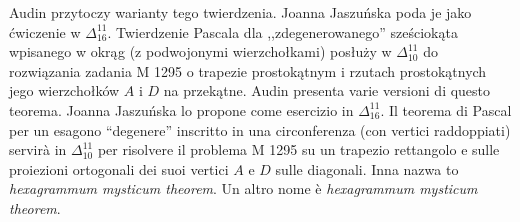 Audin \cite[s. 103, 107, 209]{audin_2003} przytoczy warianty tego twierdzenia. %
Joanna Jaszuńska poda je jako ćwiczenie w $\Delta_{16}^{11}$. %
Twierdzenie Pascala dla ,,zdegenerowanego'' sześciokąta wpisanego w okrąg (z podwojonymi wierzchołkami) posłuży w $\Delta_{10}^{11}$ do rozwiązania zadania M 1295 o trapezie prostokątnym i rzutach prostokątnych jego wierzchołków $A$ i $D$ na przekątne. %
Audin \cite[pp. 103, 107, 209]{audin_2003} presenta varie versioni di questo teorema. %
Joanna Jaszuńska lo propone come esercizio in $\Delta_{16}^{11}$. %
Il teorema di Pascal per un esagono ``degenere'' inscritto in una circonferenza (con vertici raddoppiati) servirà in $\Delta_{10}^{11}$ per risolvere il problema M 1295 su un trapezio rettangolo e sulle proiezioni ortogonali dei suoi vertici $A$ e $D$ sulle diagonali. %
Inna nazwa to \emph{hexagrammum mysticum theorem}. %
Un altro nome è \emph{hexagrammum mysticum theorem}. %


